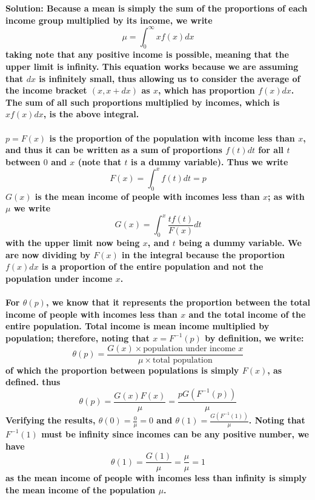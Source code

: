 \documentclass{article}
\begin{document}
\bf Solution:
\normalfont Because a mean is simply the sum of the proportions of each income group multiplied by its income, we write
\begin{equation*}
    \mu = \int_{0}^{\infty} x f(x) dx
\end{equation*}
taking note that any positive income is possible, meaning that the upper limit is infinity. This equation works because we are assuming that $dx$ is infinitely small, thus allowing us to consider the average 
of the income bracket $(x, x+dx)$ as $x$, which has proportion $f(x)dx$. The sum of all such proportions multiplied by incomes, which is $x f(x) dx$, is the above integral.
\\
\\
$p = F(x)$ is the proportion of the population with income less than $x$, and thus it can be written as a sum of proportions $f(t) dt$ for all $t$ between $0$ and $x$ (note that $t$ is a dummy variable). Thus we write
\begin{equation*}
F(x) = \int_{0}^{x} f(t)dt = p
\end{equation*}
$G(x)$ is the mean income of people with incomes less than $x$; as with $\mu$ we write
\begin{equation*}
    G(x) = \int_{0}^{x} \frac{t f(t)}{F(x)} dt
\end{equation*}
with the upper limit now being $x$, and $t$ being a dummy variable. We are now dividing by $F(x)$ in the integral because 
the proportion $f(x) dx$ is a proportion of the entire population and not the population under income $x$.
\\
\\
For $\theta(p)$, we know that it represents the proportion between the total income of people with incomes less than $x$ and the total income of the entire population. Total income is mean income multiplied by population; therefore, noting that $x = F^{-1}(p)$ by definition, we write:
\begin{equation*}
    \theta(p) = \frac{G(x) \times \text{population under income $x$}}{\mu \times \text {total population}}
\end{equation*}
of which the proportion between populations is simply $F(x)$, as defined. thus
\begin{equation*}
    \theta(p) = \frac{G(x)F(x)}{\mu} = \frac{pG(F^{-1}(p))}{\mu}
\end{equation*}
Verifying the results, $\theta(0) = \frac{0}{\mu} = 0$ and $\theta(1) = \frac{G(F^{-1}(1))}{\mu}$. Noting that $F^{-1}(1)$ must be infinity since incomes can be any positive number, we have
\begin{equation*}
    \theta(1) = \frac{G(1)}{\mu} = \frac{\mu}{\mu} = 1
\end{equation*}
as the mean income of people with incomes less than infinity is simply the mean income of the population $\mu$.
\end{document}
